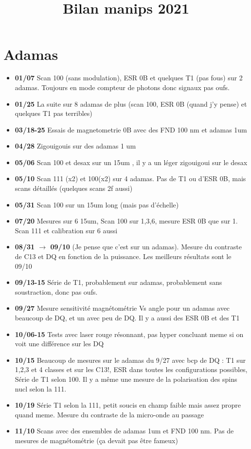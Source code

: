 \documentclass[a4paper]{article}
\title{Bilan manips 2021}
\begin{document}
\maketitle
\section{Adamas}
\begin{itemize}
\item \textbf{01/07} Scan 100 (sans modulation), ESR 0B et quelques T1 (pas fous) sur 2 adamas. Toujours en mode compteur de photons donc signaux pas oufs.
\item \textbf{01/25} La suite sur 8 adamas de plus (scan 100, ESR 0B (quand j'y pense) et quelques T1 pas terribles)
\item \textbf{03/18-25} Essais de magnetometrie 0B avec des FND 100 nm et adamas 1um
\item \textbf{04/28} Zigouigouis sur des adamas 1 um
\item \textbf{05/06} Scan 100 et desax sur un 15um , il y a un léger zigouigoui sur le desax
\item \textbf{05/10} Scan 111 (x2) et 100(x2) sur 4 adamas. Pas de T1 ou d'ESR 0B, mais scans détaillés (quelques scans 2f aussi)
\item \textbf{05/31} Scan 100 sur un 15um long (mais pas d'échelle)
\item \textbf{07/20} Mesures sur 6 15um, Scan 100 sur 1,3,6, mesure ESR 0B que sur 1. Scan 111 et calibration sur 6 aussi
\item \textbf{08/31 $\to$ 09/10} (Je pense que c'est sur un adamas). Mesure du contraste de C13 et DQ en fonction de la puissance. Les meilleurs résultats sont le 09/10
\item \textbf{09/13-15} Série de T1, probablement sur adamas, probablement sans soustraction, donc pas oufs.
\item \textbf{09/27} Mesure sensitivité magnétométrie Vs angle pour un adamas avec beaucoup de DQ, et un avec peu de DQ. Il y a aussi des ESR 0B et des T1
\item \textbf{10/06-15} Tests avec laser rouge résonnant, pas hyper concluant meme si on voit une différence sur les DQ
\item \textbf{10/15} Beaucoup de mesures sur le adamas du 9/27 avec bcp de DQ : T1 sur 1,2,3 et 4 classes et sur les C13!, ESR dans toutes les configurations possibles, Série de T1 selon 100. Il y a même une mesure de la polarisation des spins nucl selon la 111. 
\item \textbf{10/19} Série T1 selon la 111, petit soucis en champ faible mais assez propre quand meme. Mesure du contraste de la micro-onde au passage
\item \textbf{11/10} Scans avec des ensembles de adamas 1um et FND 100 nm. Pas de mesures de magnétométrie (ça devait pas être fameux)
\end{itemize}
\end{document}
